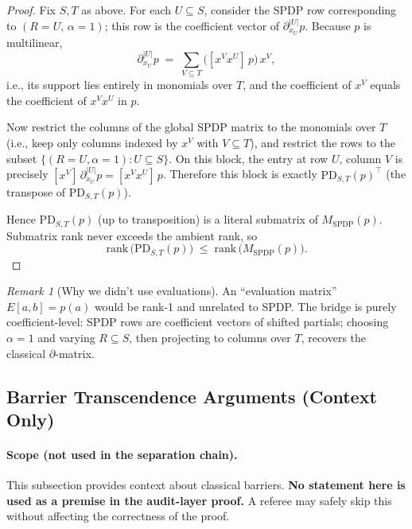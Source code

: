 \documentclass[12pt]{article}
\theoremstyle{definition}
\theoremstyle{definition}
\theoremstyle{remark}
\newtheorem{remark}{Remark}
\theoremstyle{remark}
\begin{document}
\begin{proof}
Fix $S, T$ as above. For each $U \subseteq S$, consider the SPDP row corresponding to $(R = U,\, \alpha = 1)$; this row is the coefficient vector of $\partial_{x_U}^{|U|} p$. Because $p$ is multilinear,
\[
\partial_{x_U}^{|U|} p \;=\; \sum_{V \subseteq T} \bigl([x^V x^U]\, p\bigr)\, x^V,
\]
i.e., its support lies entirely in monomials over $T$, and the coefficient of $x^V$ equals the coefficient of $x^V x^U$ in $p$.

Now restrict the columns of the global SPDP matrix to the monomials over $T$ (i.e., keep only columns indexed by $x^V$ with $V \subseteq T$), and restrict the rows to the subset $\{(R = U, \alpha = 1) : U \subseteq S\}$. On this block, the entry at row $U$, column $V$ is precisely $[x^V]\, \partial_{x_U}^{|U|} p = [x^V x^U]\, p$. Therefore this block is exactly $\mathrm{PD}_{S,T}(p)^\top$ (the transpose of $\mathrm{PD}_{S,T}(p)$).

Hence $\mathrm{PD}_{S,T}(p)$ (up to transposition) is a literal submatrix of $M_{\mathrm{SPDP}}(p)$. Submatrix rank never exceeds the ambient rank, so
\[
\mathrm{rank}\,\bigl(\mathrm{PD}_{S,T}(p)\bigr) \;\le\; \mathrm{rank}\,\bigl(M_{\mathrm{SPDP}}(p)\bigr).
\]
\end{proof}

\begin{remark}[Why we didn't use evaluations]
An ``evaluation matrix'' $E[a,b] = p(a)$ would be rank-1 and unrelated to SPDP. The bridge is purely coefficient-level: SPDP rows are coefficient vectors of shifted partials; choosing $\alpha = 1$ and varying $R \subseteq S$, then projecting to columns over $T$, recovers the classical $\partial$-matrix.
\end{remark}

\subsection{Barrier Transcendence Arguments (Context Only)}

\paragraph{Scope (not used in the separation chain).}
This subsection provides context about classical barriers. \textbf{No statement here is used
as a premise in the audit-layer proof.} A referee may safely skip this without affecting
the correctness of the proof.

\medskip
\end{document}
